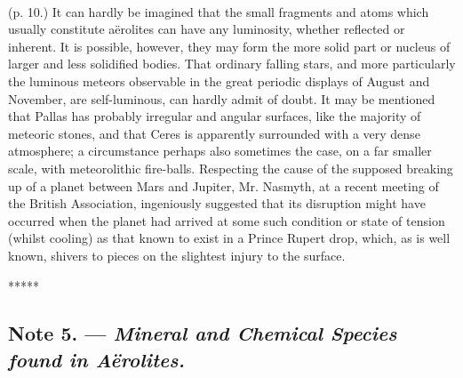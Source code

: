 \documentclass[a4paper, 12pt, oneside]{article}
\begin{document}
\paragraph{}
(p. 10.) It can hardly be imagined that the small fragments and atoms which usually constitute aërolites can have any luminosity, whether reflected or inherent. It is possible, however, they may form the more solid part or nucleus of larger and less solidified bodies. That ordinary falling stars, and more particularly the luminous meteors observable in the great periodic displays of August and November, are self-luminous, can hardly admit of doubt. It may be mentioned that Pallas has probably irregular and angular surfaces, like the majority of meteoric stones, and that Ceres is apparently surrounded with a very dense atmosphere; a circumstance perhaps also sometimes the case, on a far smaller scale, with meteorolithic fire-balls. Respecting the cause of the supposed breaking up of a planet between Mars and Jupiter, Mr. Nasmyth, at a recent meeting of the British Association, ingeniously suggested that its disruption might have occurred when the planet had arrived at some such condition or state of tension (whilst cooling) as that known to exist in a Prince Rupert drop, which, as is well known, shivers to pieces on the slightest injury to the surface.

\centerline{*\hspace{15mm}*\hspace{15mm}*\hspace{15mm}*\hspace{15mm}*}
\bigskip
\clearpage
\vspace*{\fill}
\subsection{Note 5. --- \emph{Mineral and Chemical Species found in Aërolites.}}
\vspace*{\fill}
\clearpage
\end{document}
